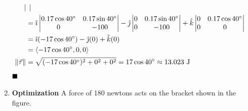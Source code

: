 \begin{enumerate}
\begin{align*}
\begin{vmatrix}
                                    \end{vmatrix}               \\
                                & = \hat{\imath} \begin{vmatrix}
                                                     0.17\cos40^{\circ} & 0.17\sin40^{\circ} \\
                                                     0                  & -100
                                                 \end{vmatrix} - \hat{\jmath} \begin{vmatrix}
                                                                                  0 & 0.17\sin40^{\circ} \\
                                                                                  0 & -100
                                                                              \end{vmatrix} + \hat{k} \begin{vmatrix}
                                                                                                          0 & 0.17\cos40^{\circ} \\
                                                                                                          0 & 0
                                                                                                      \end{vmatrix} \\
                                & = \hat{\imath}(-17\cos40^{\circ}) - \hat{\jmath}(0) + \hat{k}(0)                           \\
                                & = \langle -17\cos40^{\circ}, 0, 0 \rangle                                                  \\
              \left\lVert\vec{\tau}\right\rVert & = \sqrt{(-17\cos40^{\circ})^2 + 0^2 + 0^2} = 17\cos40^{\circ} \approx 13.023 \text{ J}
          \end{align*}
          $\hfill\blacksquare$
          \setcounter{enumi}{28}
    \item \textbf{Optimization} A force of 180 newtons acts on the bracket shown in the figure.
          \begin{center}

\end{center}
\end{enumerate}
